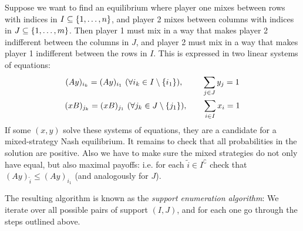 \documentclass[a4paper]{scrreprt}
\begin{document}
    Suppose we want to find an equilibrium where player one mixes between rows with indices in $I \subseteq \{1, \dots, n\}$, and player 2 mixes between columns with indices in $J \subseteq \{1, \dots, m\}$. Then player 1 must mix in a way that makes player 2 indifferent between the columns in $J$, and player 2 must mix in a way that makes player 1 indifferent between the rows in $I$.
    This is expressed in two linear systems of equations:
    \begin{gather}
        (Ay)_{i_k} = (Ay)_{i_1} ~(\forall i_k \in I \setminus\{i_1\}), \qquad\;\, \sum_{j \in J} y_j = 1 \\
        (xB)_{j_k} = (xB)_{j_1} ~(\forall j_k \in J \setminus\{j_1\}), \qquad \sum_{i \in I} x_i = 1
    \end{gather}
    If some $(x, y)$ solve these systems of equations, they are a candidate for a mixed-strategy Nash equilibrium.
    It remains to check that all probabilities in the solution are positive. Also we have to make sure the mixed strategies do not only have equal, but also maximal payoffs: i.e. for each $\tilde{i}\in I^\complement$ check that $(Ay)_{\tilde{i}} \leq (Ay)_{i_1}$ (and analogously for $J$).
    
    The resulting algorithm is known as the \emph{support enumeration algorithm}: We iterate over all possible pairs of support $(I, J)$, and for each one go through the steps outlined above. 
    
    
\end{document}
